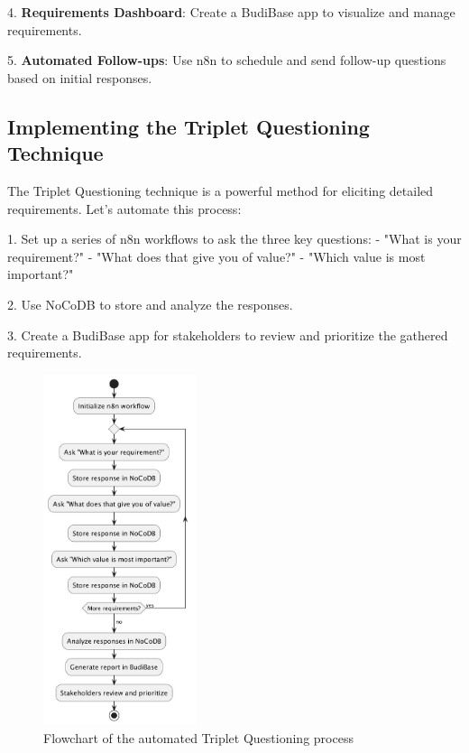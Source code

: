 
4. \textbf{Requirements Dashboard}: Create a BudiBase app to visualize and manage requirements.


5. \textbf{Automated Follow-ups}: Use n8n to schedule and send follow-up questions based on initial responses.


\subsection{Implementing the Triplet Questioning Technique}

The Triplet Questioning technique is a powerful method for eliciting detailed requirements. Let's automate this process:

1. Set up a series of n8n workflows to ask the three key questions:
- "What is your requirement?"
- "What does that give you of value?"
- "Which value is most important?"

2. Use NoCoDB to store and analyze the responses.

3. Create a BudiBase app for stakeholders to review and prioritize the gathered requirements.

\begin{figure}
    \centering
    \includegraphics[width=0.40\textwidth]{./figures/03-flowchart-triplet-questioning.png}
    \caption{Flowchart of the automated Triplet Questioning process}
    \label{fig:triplet-questioning}
\end{figure}
